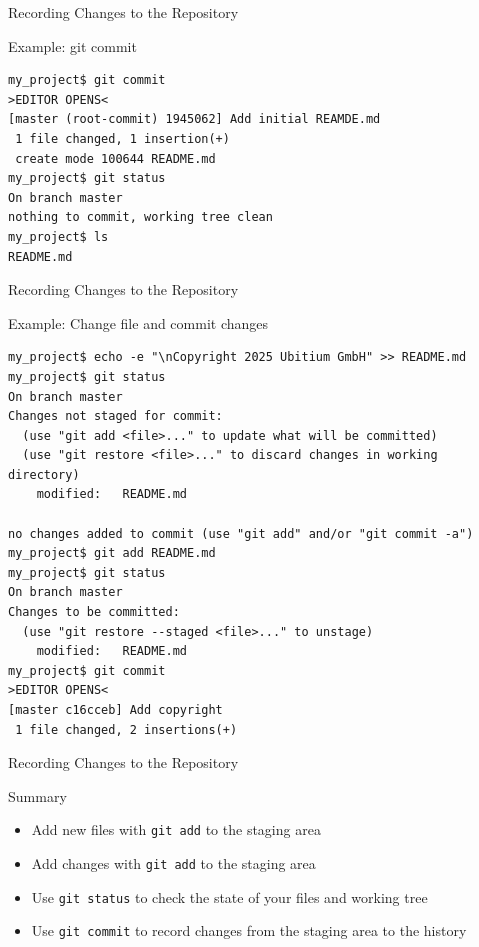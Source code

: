 \documentclass[aspectratio=169]{beamer}
\renewcommand{\footnotesize}{\tiny}
\newcommand{\sectiontitle}{}
\begin{document}
\begin{frame}[fragile]{Recording Changes to the Repository}{\sectiontitle}
\begin{block}{Example: \ttfamily git commit}
\begin{verbatim}
my_project$ git commit
>EDITOR OPENS<
[master (root-commit) 1945062] Add initial REAMDE.md
 1 file changed, 1 insertion(+)
 create mode 100644 README.md
my_project$ git status
On branch master
nothing to commit, working tree clean
my_project$ ls
README.md
\end{verbatim}
\end{block}
\end{frame}

\begin{frame}[fragile]{Recording Changes to the Repository}{\sectiontitle}
\begin{block}{Example: Change file and commit changes}
\begin{verbatim}
my_project$ echo -e "\nCopyright 2025 Ubitium GmbH" >> README.md
my_project$ git status
On branch master
Changes not staged for commit:
  (use "git add <file>..." to update what will be committed)
  (use "git restore <file>..." to discard changes in working directory)
    modified:   README.md

no changes added to commit (use "git add" and/or "git commit -a")
my_project$ git add README.md
my_project$ git status
On branch master
Changes to be committed:
  (use "git restore --staged <file>..." to unstage)
    modified:   README.md
my_project$ git commit
>EDITOR OPENS<
[master c16cceb] Add copyright
 1 file changed, 2 insertions(+)
\end{verbatim}
\end{block}
\end{frame}

\begin{frame}[fragile]{Recording Changes to the Repository}{\sectiontitle}
\begin{block}{Summary}
\begin{itemize}
    \item Add new files with \verb|git add| to the staging area
    \item Add changes with \verb|git add| to the staging area
    \item Use \verb|git status| to check the state of your files and working tree
    \item Use \verb|git commit| to record changes from the staging area to the history
\end{itemize}
\end{block}
\end{frame}
\end{document}
